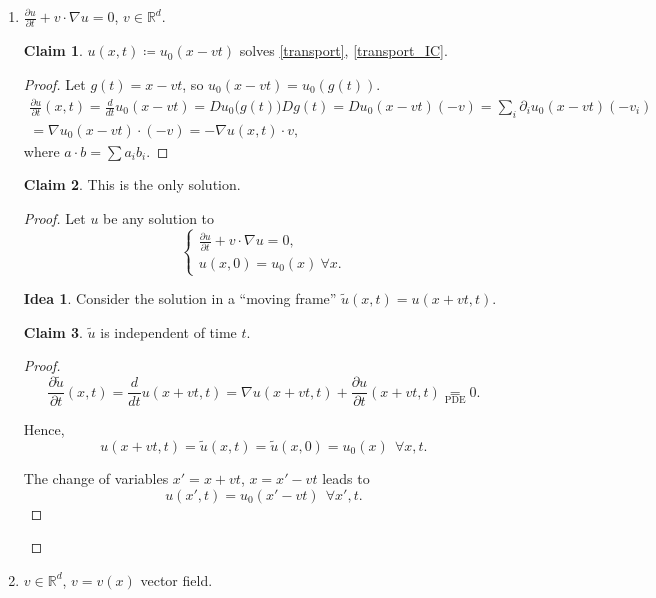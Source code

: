 \documentclass[12pt]{article}
\theoremstyle{definition}
\newtheorem*{claim*}{Claim}
\newtheorem*{idea}{Idea}
\begin{document}
\begin{enumerate}[label=\alph*)]
\item $\frac{\partial u}{\partial t}+v\cdot\nabla u=0$, $v\in\mathbb{R}^d$.

\begin{claim*}
$u(x,t)\coloneqq u_0(x-vt)$ solves \ref{transport}, \eqref{transport_IC}.
\end{claim*}

\begin{proof}
Let $g(t)=x-vt$, so $u_0(x-vt)=u_0(g(t))$.
\begin{multline*}
\frac{\partial u}{\partial t}(x,t)=\frac{d}{dt}u_0(x-vt)=Du_0\big(g(t)\big)Dg(t)=Du_0(x-vt)(-v)=\sum_i\partial_iu_0(x-vt)(-v_i)\\
=\nabla u_0(x-vt)\cdot(-v)=-\nabla u(x,t)\cdot v,
\end{multline*}
where $a\cdot b=\sum a_ib_i$.
\end{proof}

\begin{claim*}
This is the only solution.
\end{claim*}

\begin{proof}
Let $u$ be any solution to
\[\left\{\begin{array}{l}\frac{\partial u}{\partial t}+v\cdot\nabla u=0,\\u(x,0)=u_0(x)\ \forall x.\end{array}\right.\]

\begin{idea}
Consider the solution in a ``moving frame'' $\tilde{u}(x,t)=u(x+vt,t)$.
\end{idea}

\begin{claim*}
$\tilde{u}$ is independent of time $t$.
\end{claim*}

\begin{proof}
\[\frac{\partial\tilde{u}}{\partial t}(x,t)=\frac{d}{dt}u(x+vt,t)=\nabla u(x+vt,t)+\frac{\partial u}{\partial t}(x+vt,t)\underset{\text{PDE}}{=}0.\]

Hence,
\[u(x+vt,t)=\tilde{u}(x,t)=\tilde{u}(x,0)=u_0(x)\ \ \forall x,t.\]

The change of variables $x'=x+vt$, $x=x'-vt$ leads to
\[u(x',t)=u_0(x'-vt)\ \ \forall x',t.\]
\end{proof}
\end{proof}

\item $v\in\mathbb{R}^d$, $v=v(x)$ vector field.


\end{enumerate}
\end{document}
